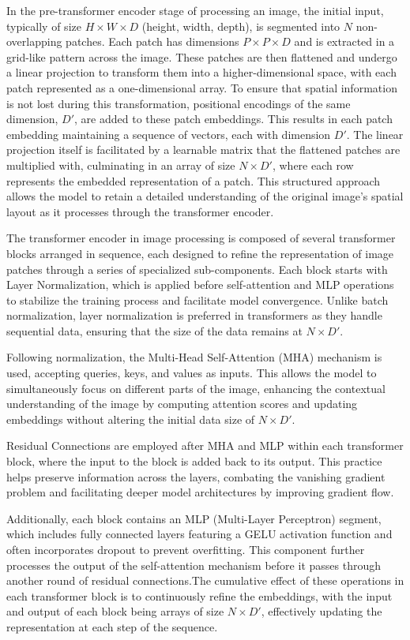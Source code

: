 In the pre-transformer encoder stage of processing an image, the initial input, typically of size \(H \times W \times D\) (height, width, depth), 
is segmented into \(N\) non-overlapping patches. Each patch has dimensions \(P \times P \times D\) and is extracted in a grid-like pattern across 
the image. These patches are then flattened and undergo a linear projection to transform them into a higher-dimensional space, with each patch represented 
as a one-dimensional array. To ensure that spatial information is not lost during this transformation, positional encodings of the same dimension, 
\(D'\), are added to these patch embeddings. This results in each patch embedding maintaining a sequence of vectors, each with dimension \(D'\). 
The linear projection itself is facilitated by a learnable matrix that the flattened patches are multiplied with, culminating in an array of size 
\(N \times D'\), where each row represents the embedded representation of a patch. This structured approach allows the model to retain a detailed 
understanding of the original image’s spatial layout as it processes through the transformer encoder.


The transformer encoder in image processing is composed of several transformer blocks arranged in sequence, each designed to refine the representation of image 
patches through a series of specialized sub-components. Each block starts with Layer Normalization, which is applied before self-attention and MLP operations 
to stabilize the training process and facilitate model convergence. Unlike batch normalization, layer normalization is preferred in transformers as they handle 
sequential data, ensuring that the size of the data remains at \(N \times D'\).

Following normalization, the Multi-Head Self-Attention (MHA) mechanism is used, accepting queries, keys, and values as inputs. This allows 
the model to simultaneously focus on different parts of the image, enhancing the contextual understanding of the image by computing attention scores and 
updating embeddings without altering the initial data size of \(N \times D'\).

Residual Connections are employed after MHA and MLP within each transformer block, where the input to the block is added back to its output. 
This practice helps preserve information across the layers, combating the vanishing gradient problem and facilitating deeper model architectures by 
improving gradient flow.

Additionally, each block contains an MLP (Multi-Layer Perceptron) segment, which includes fully connected layers featuring a GELU activation function 
and often incorporates dropout to prevent overfitting. This component further processes the output of the self-attention mechanism before it passes 
through another round of residual connections.The cumulative effect of these operations in each transformer block is to continuously refine the embeddings, 
with the input and output of each block being arrays of size \(N \times D'\), effectively updating the representation at each step of the sequence.



